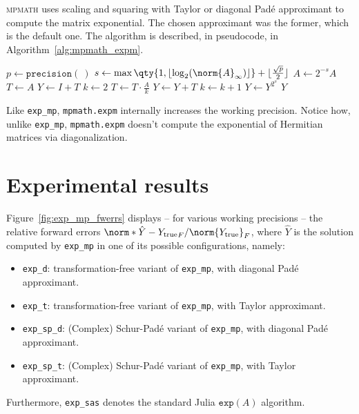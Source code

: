\textsc{mpmath} uses scaling and squaring with Taylor or diagonal Padé approximant to compute the matrix exponential. The chosen approximant was the former, which is the default one. The algorithm is described, in pseudocode, in Algorithm~\ref{alg:mpmath_expm}.
\begin{algorithm}[H]
	\caption{\emph{Pseudocode for \texttt{mpmath.expm}, Taylor version}}
	\label{alg:mpmath_expm}
	\begin{algorithmic}
			\State $p\gets\mathtt{precision}(\ )$	
			\State $s\gets\max\qty{1,\lfloor\log_2(\norm{A}_{\infty})\rfloor}+\lfloor\frac{\sqrt{p}}{2}\rfloor$	
				\State $A\gets 2^{-s}A$
				\State $T\gets A$
				\State $Y \gets I + T$
				\State $k\gets 2$
					\State $T\gets T\cdot\frac{A}{k}$
					\State $Y\gets Y+T$
					\State $k\gets k+1$
				\EndWhile
			\EndWith
			\State $Y\gets Y^{2^s}$
			\State \Return $Y$
		\EndFunction
	\end{algorithmic}
\end{algorithm}
Like \texttt{exp\_mp}, \texttt{mpmath.expm} internally increases the working precision.
Notice how, unlike \texttt{exp\_mp}, \texttt{mpmath.expm} doesn't compute the exponential of Hermitian matrices via diagonalization.

\section{Experimental results}
Figure~\vref{fig:exp_mp_fwerrs} displays -- for various working precisions -- the relative forward errors $\norm*{\hat{Y}-Y_{\textup{true}}}_F/\norm{Y_{\textup{true}}}_F$, where $\hat{Y}$ is the solution computed by \texttt{exp\_mp} in one of its possible configurations, namely:
\begin{itemize}
	\item \texttt{exp\_d}: transformation-free variant of \texttt{exp\_mp}, with diagonal Padé approximant. 
	\item \texttt{exp\_t}: transformation-free variant of \texttt{exp\_mp}, with Taylor approximant.
	\item \texttt{exp\_sp\_d}: (Complex) Schur-Padé variant of \texttt{exp\_mp}, with diagonal Padé approximant. 
	\item \texttt{exp\_sp\_t}: (Complex) Schur-Padé variant of \texttt{exp\_mp}, with Taylor approximant.
\end{itemize}
Furthermore, \texttt{exp\_sas} denotes the standard Julia $\mathtt{exp}(A)$ algorithm. 

